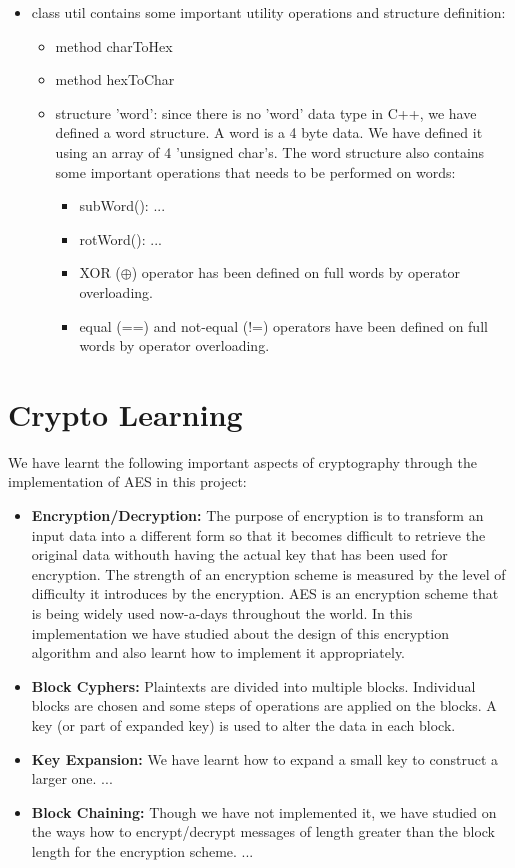 \documentclass[twoside]{article}
\begin{document}
\begin{itemize}
\begin{itemize}
	\end{itemize}
	\item class util contains some important utility operations and structure definition:
	\begin{itemize}
		\item method charToHex
		\item method hexToChar
		\item structure 'word': since there is no 'word' data type in C++, we have defined a word structure. A word is a 4 byte data. We have defined it using an array of 4 'unsigned char's. The word structure also contains some important operations that needs to be performed on words:
		\begin{itemize}
			\item subWord(): ...
			\item rotWord(): ...
			\item XOR ($\oplus$) operator has been defined on full words by operator overloading.
			\item equal (==) and not-equal (!=) operators have been defined on full words by operator overloading.
		\end{itemize}
	\end{itemize}
\end{itemize}


\section{Crypto Learning}
We have learnt the following important aspects of cryptography through the implementation of AES in this project:
\begin{itemize}
\item \textbf{Encryption/Decryption:} The purpose of encryption is to transform an input data into a different form so that it becomes difficult to retrieve the original data withouth having the actual key that has been used for encryption. The strength of an encryption scheme is measured by the level of difficulty it introduces by the encryption. AES is an encryption scheme that is being widely used now-a-days throughout the world. In this implementation we have studied about the design of this encryption algorithm and also learnt how to implement it appropriately.
\item \textbf{Block Cyphers:} Plaintexts are divided into multiple blocks. Individual blocks are chosen and some steps of operations are applied on the blocks. A key (or part of expanded key) is used to alter the data in each block.
\item \textbf{Key Expansion:} We have learnt how to expand a small key to construct a larger one. ...
\item \textbf{Block Chaining:} Though we have not implemented it, we have studied on the ways how to encrypt/decrypt messages of length greater than the block length for the encryption scheme. ...
\end{itemize}
\end{document}
